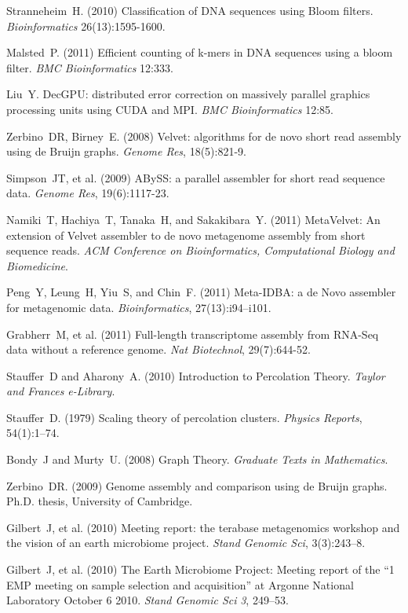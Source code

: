 \documentclass{pnastwo}
\begin{document}
\begin{article}
\begin{thebibliography}{10}
 Stranneheim~H. (2010) Classification of DNA sequences 
using Bloom filters. {\it Bioinformatics} 26(13):1595-1600.

 Malsted~P. (2011) Efficient counting of k-mers in DNA 
sequences using a bloom filter. {\it BMC Bioinformatics} 12:333.

 Liu~Y. DecGPU: distributed error correction on 
massively parallel graphics processing units using CUDA and MPI. {\it 
BMC Bioinformatics} 12:85.

 Zerbino~DR, Birney~E. (2008) Velvet: algorithms for de novo 
short read assembly using de Bruijn graphs. {\it Genome Res}, 18(5):821-9.

 Simpson~JT, et al. (2009) ABySS: a parallel assembler for 
short read sequence data. {\it Genome Res}, 19(6):1117-23.

 Namiki~T, Hachiya~T, Tanaka~H, and Sakakibara~Y. (2011) 
MetaVelvet: An extension of Velvet assembler to de novo metagenome assembly 
from short sequence reads. {\it ACM Conference on Bioinformatics, 
Computational Biology and Biomedicine}.

 Peng~Y, Leung~H, Yiu~S, and Chin~F. (2011) Meta-IDBA: 
a de Novo assembler for metagenomic data. {\it Bioinformatics}, 
27(13):i94--i101.

 Grabherr~M, et al. (2011) Full-length transcriptome assembly 
from RNA-Seq data without a reference genome. {\it Nat Biotechnol}, 
29(7):644-52.

 Stauffer~D and Aharony~A. (2010) Introduction to 
Percolation Theory. {\it Taylor and Frances e-Library}.

 Stauffer~D. (1979) Scaling theory of 
percolation clusters. {\it Physics Reports}, 54(1):1--74.

 Bondy~J and Murty~U. (2008) Graph Theory. {\it 
Graduate Texts in Mathematics}.

 Zerbino~DR. (2009) Genome assembly and comparison 
using de Bruijn graphs. Ph.D. thesis, University of Cambridge.

 Gilbert~J, et al. (2010) Meeting report: the terabase 
metagenomics workshop and the vision of an earth microbiome project. {\it 
Stand Genomic Sci}, 3(3):243--8.

 Gilbert~J, et al. (2010) The Earth Microbiome Project: 
Meeting report of the ``1 EMP meeting on sample selection and acquisition'' 
at Argonne National Laboratory October 6 2010. {\it Stand Genomic Sci} 
\emph{3}, 249--53.


\end{thebibliography}
\end{article}
\end{document}
